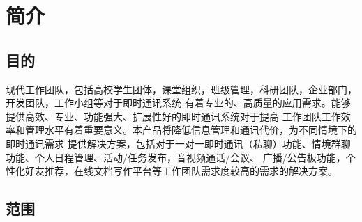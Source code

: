 \chapter{简介}
\section{目的}


现代工作团队，包括高校学生团体，课堂组织，班级管理，科研团队，企业部门，开发团队，工作小组等对于即时通讯系统
有着专业的、高质量的应用需求。能够提供高效、专业、功能强大、扩展性好的即时通讯系统对于提高
工作团队工作效率和管理水平有着重要意义。本产品将降低信息管理和通讯代价，为不同情境下的即时通讯需求
提供解决方案，包括对于一对一即时通讯（私聊）功能、情境群聊功能、个人日程管理、活动/任务发布，音视频通话/会议、
广播/公告板功能，个性化好友推荐，在线文档写作平台等工作团队需求度较高的需求的解决方案。

\section{范围}

